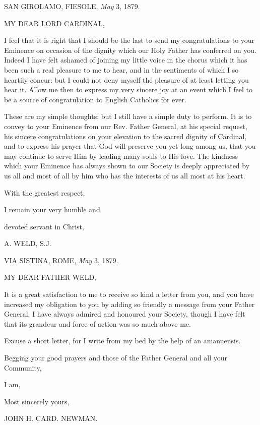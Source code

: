 
SAN GIROLAMO, FIESOLE,
\emph{May} 3, 1879.

MY DEAR LORD
CARDINAL,

I feel that it is right that I should be the last to send my
congratulations to your Eminence on occasion of the dignity which our
Holy Father has conferred on you. Indeed I have felt ashamed of
joining my little voice in the chorus which it has been such a real
pleasure to me to hear, and in the sentiments of which I so heartily
concur: but I could not deny myself the pleasure of at least
letting you hear it. Allow me then to express my very sincere joy at
an event which I feel to be a source of congratulation to English
Catholics for ever.

These are my simple thoughts; but I still have a simple duty to
perform. It is to convey to your Eminence from our Rev. Father
General, at his special request, his sincere congratulations on your
elevation to the sacred dignity of Cardinal, and to express his prayer
that God will preserve you yet long among us, that you may continue to
serve Him by leading many souls to His love. The kindness which your
Eminence has always shown to our Society is deeply appreciated by us
all and most of all by him who has the interests of us all most at his
heart.

With the greatest respect,

I remain your very humble and

devoted servant in Christ,

A. WELD, S.J.


VIA SISTINA, ROME,
\emph{May} 3, 1879.

MY DEAR FATHER
WELD,

It is a great satisfaction to me to receive so kind a letter from you,
and you have increased my obligation to you by adding so friendly a
message from your Father General. I have always admired and honoured
your Society, though I have felt that its grandeur and force of
action was so much above me.

Excuse a short letter, for I write from my bed by the help of an
amanuensis.

Begging your good prayers and those of the Father General and all
your Community,

I am,

Most sincerely yours,

JOHN H. CARD. NEWMAN.

